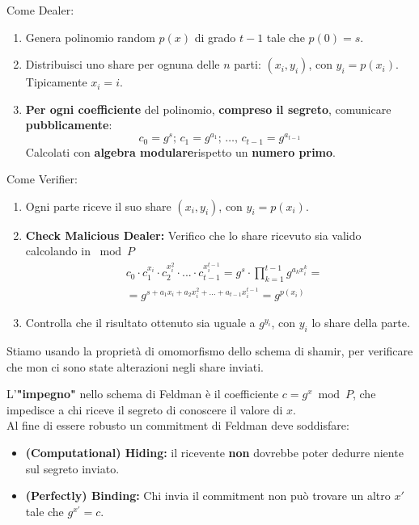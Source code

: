 \begin{theorem}\label{thm:feldvss}
Come Dealer:
\begin{enumerate}
    \item Genera polinomio random $p(x)$ di grado $t-1$ tale che $p(0)=s$.
    \item Distribuisci uno share per ognuna delle $n$ parti: $(x_i, y_i)$, con $y_i=p(x_i)$. Tipicamente $x_i=i$.
    \item \textbf{Per ogni coefficiente} del polinomio, \textbf{compreso il segreto}, comunicare \textbf{pubblicamente}:
    \[c_0=g^s;\,c_1=g^{a_1};\,\dots,\,c_{t-1}=g^{a_{t-1}}\]
    Calcolati con \textbf{algebra modulare}\footnotemark rispetto un \textbf{numero primo}.
\end{enumerate}
Come Verifier:
\begin{enumerate}
    \item Ogni parte riceve il suo share $(x_i, y_i)$, con $y_i=p(x_i)$.
    \item \textbf{Check Malicious Dealer:} Verifico che lo share ricevuto sia valido calcolando in $\bmod{P}$
    \begin{equation*}
        \begin{aligned}
            &c_0\cdot c_1^{x_i}\cdot c_2^{x_i^2}\cdot ...\cdot c_{t-1}^{x_i^{t-1}}=
            g^s\cdot\prod_ {k=1}^{t-1}g^{a_k x_i^k}=\\
            &=g^{s+a_1x_i+a_2x_i^2+\dots+a_{t-1}x_i^{t-1}}=g^{p(x_i)}
        \end{aligned}
    \end{equation*}
    \item Controlla che il risultato ottenuto sia uguale a $g^{y_i}$, con $y_i$ lo share della parte.
\end{enumerate}
\end{theorem}\pagebreak
\begin{note}
Stiamo usando la proprietà di omomorfismo dello schema di shamir, per verificare che mon ci sono state alterazioni negli share inviati.
\end{note}
\begin{definition}\label{def:commitment}
L'\textbf{"impegno"} nello schema di Feldman è il coefficiente $c=g^x\bmod{P}$, che impedisce a chi riceve il segreto di conoscere il valore di $x$.\\
Al fine di essere robusto un commitment di Feldman deve soddisfare:
\begin{itemize}
    \item \textbf{(Computational) Hiding:} il ricevente \textbf{non} dovrebbe poter dedurre niente sul segreto inviato.
    \item \textbf{(Perfectly) Binding:} Chi invia il commitment non può trovare un altro $x'$ tale che $g^{x'}=c$.\footnotemark
\end{itemize}
\end{definition}
